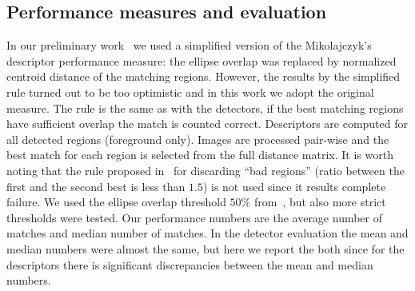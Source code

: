 \documentclass[10pt,journal,cspaper,compsoc]{IEEEtran}
\begin{document}
%
\subsection{Performance measures and evaluation\label{sec:descrperformance}}
In our preliminary work~\cite{LanKanKam:2012} we used a simplified
version of the Mikolajczyk's descriptor performance measure: the ellipse
overlap was replaced by normalized centroid distance of the matching
regions. However, the results by the simplified rule turned out to be
too optimistic and in this work we adopt the original measure. The
rule is the same as with the detectors, if the best matching regions
have sufficient overlap the match is counted correct.
Descriptors are computed for
all detected regions (foreground only). Images are processed
pair-wise and the best match for each region is selected from
the full distance matrix.
It is worth noting
that the rule proposed in~\cite{Low:2004} for discarding ``bad regions''
(ratio between the first and the second best is less than $1.5$) is
not used since it results complete failure.
We used the ellipse
overlap threshold $50\%$ from~\cite{MikSch:2005}, but also more strict
thresholds were tested.
Our performance numbers are the average number of matches and median
number of matches. In the detector evaluation the mean and median
numbers were almost the same, but here we report the both since
for the descriptors there is significant discrepancies between the mean
and median numbers.
%

%
\end{document}
